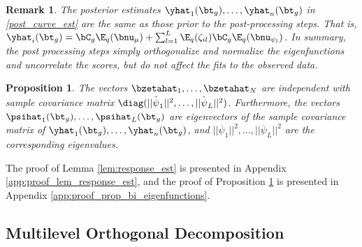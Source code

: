 \documentclass[ba]{imsart}
\numberwithin{equation}{section}
\theoremstyle{plain}
\newtheorem{prop}{Proposition}[section]
\newtheorem*{remark}{Remark}
\def\numu{\bnu_\mu}
\newcommand\nupsi[1]{\bnu_{\psi_{#1}}}
\begin{document}
\begin{remark}
	
	The posterior estimates $\yhat_1 (\bt_g), \dots, \yhat_n (\bt_g)$ in \eqref{post_curve_est} are
	the same as those prior to the post-processing steps. That is,
	$\yhat_i (\bt_g) = \bC_g \E_q (\numu) + \sum_{l=1}^L \E_q (\zeta_{il}) \bC_g \E_q (\nupsi{l})$.
	In summary, the post processing steps simply
	orthogonalize and normalize the eigenfunctions and uncorrelate the scores, but do not affect the fits to the
	observed data.
	
\end{remark}

\begin{prop}
	
	The vectors $\bzetahat_1, \dots, \bzetahat_N$ are independent with sample covariance matrix
	$\diag (|| \overset{\textbf{.}}{\psi}_1 ||^2, \dots, || \overset{\textbf{.}}{\psi}_L ||^2)$.
	Furthermore, the vectors $\psihat_1 (\bt_g), \dots, \psihat_L (\bt_g)$ are eigenvectors of the sample
	covariance matrix of $\yhat_1 (\bt_g), \dots, \yhat_n (\bt_g)$, and $|| \overset{\textbf{.}}{\psi}_1 ||^2, \dots,
	|| \overset{\textbf{.}}{\psi}_L ||^2$ are the corresponding eigenvalues.
	
\label{prop:bi_orthogonal}
\end{prop}

	
	

\noindent The proof of Lemma \ref{lem:response_est} is presented in Appendix \ref{app:proof_lem_response_est},
and the proof of Proposition \ref{prop:bi_orthogonal} is presented in Appendix \ref{app:proof_prop_bi_eigenfunctions}.


\subsection{Multilevel Orthogonal Decomposition}
\label{sec:mult_biorthogonal}
\end{document}
